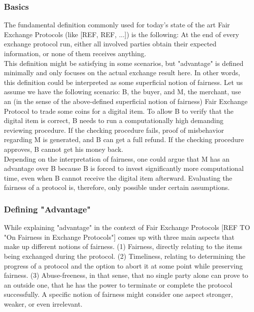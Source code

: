 \documentclass{cacthesis}
\begin{document}
        \subsubsection{Basics}
        The fundamental definition commonly used for today's state of the art Fair Exchange Protocols (like [REF, REF, ...]) is the following: At the end of every exchange protocol run, either all involved parties obtain their expected information, or none of them receives anything. \\
        This definition might be satisfying in some scenarios, but "advantage" is defined minimally and only focuses on the actual exchange result here. In other words, this definition could be interpreted as some superficial notion of fairness. Let us assume we have the following scenario: B, the buyer, and M, the merchant, use an (in the sense of the above-defined superficial notion of fairness) Fair Exchange Protocol to trade some coins for a digital item. To allow B to verify that the digital item is correct, B needs to run a computationally high demanding reviewing procedure. If the checking procedure fails, proof of misbehavior regarding M is generated, and B can get a full refund. If the checking procedure approves, B cannot get his money back. \\
        Depending on the interpretation of fairness, one could argue that M has an advantage over B because B is forced to invest significantly more computational time, even when B cannot receive the digital item afterward. Evaluating the fairness of a protocol is, therefore, only possible under certain assumptions. \\
        \subsubsection{Defining "Advantage"}
        While explaining "advantage" in the context of Fair Exchange Protocols [REF TO "On Fairness in Exchange Protocols"] comes up with three main aspects that make up different notions of fairness. (1) Fairness, directly relating to the items being exchanged during the protocol. (2) Timeliness, relating to determining the progress of a protocol and the option to abort it at some point while preserving fairness. (3) Abuse-freeness, in that sense, that no single party alone can prove to an outside one, that he has the power to terminate or complete the protocol successfully. A specific notion of fairness might consider one aspect stronger, weaker, or even irrelevant. \\
\end{document}
